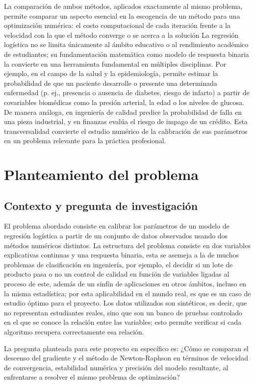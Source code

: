 La comparación de ambos métodos, aplicados exactamente al mismo problema, permite comparar un aspecto esencial en la escogencia de un método para una optimización numérica: el costo computacional de cada iteración frente a la velocidad con la que el método converge o se acerca a la solución
La regresión logística no se limita únicamente al ámbito educativo o al rendimiento académico de estudiantes; su fundamentación matemática como modelo de respuesta binaria la convierte en una herramienta fundamental en múltiples disciplinas. Por ejemplo, en el campo de la salud y la epidemiología, permite estimar la probabilidad de que un paciente desarrolle o presente una determinada enfermedad (p. ej., presencia o ausencia de diabetes, riesgo de infarto) a partir de covariables biomédicas como la presión arterial, la edad o los niveles de glucosa. De manera análoga, en ingeniería de calidad predice la probabilidad de falla en una pieza industrial, y en finanzas evalúa el riesgo de impago de un crédito. Esta transversalidad convierte el estudio numérico de la calibración de sus parámetros en un problema relevante para la práctica profesional.
\section{Planteamiento del problema}

\subsection{Contexto y pregunta de investigación}
El problema abordado consiste en calibrar los parámetros de un modelo de regresión logística a partir de un conjunto de datos observados usando dos métodos numéricos distintos. La estructura del problema consiste en dos variables explicativas continuas y una respuesta binaria, esta se asemeja a la de muchos problemas de clasificación en ingeniería, por ejemplo, el decidir si un lote de producto pasa o no un control de calidad en función de variables ligadas al proceso de este, además de un sinfín de aplicaciones en otros ámbitos, incluso en la misma estadística; por esta aplicabilidad en el mundo real, es que es un caso de estudio óptimo para el proyecto. Los datos utilizados son sintéticos, es decir, que no representan estudiantes reales, sino que son un banco de pruebas controlado en el que se conoce la relación entre las variables; esto permite verificar si cada algoritmo recupera correctamente esa relación.

La pregunta planteada para este proyecto en específico es: ¿Cómo se comparan el descenso del gradiente y el método de Newton-Raphson en términos de velocidad de convergencia, estabilidad numérica y precisión del modelo resultante, al enfrentarse a resolver el mismo problema de optimización?

